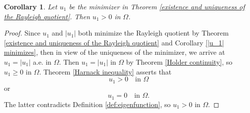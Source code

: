\documentclass[a4paper,12pt,reqno]{amsart}
\numberwithin{equation}{section}
\theoremstyle{plain}
\newtheorem{corollary}[theorem]{Corollary}
\theoremstyle{definition}
\begin{document}
\begin{corollary}\label{positivity of the first eigenfuncion}
Let $u_{1}$ be the minimizer in Theorem \ref{existence and uniqueness of the Rayleigh quotient}. Then $u_{1}>0$ in $\Omega$.
\end{corollary}
\begin{proof}
Since $u_{1}$ and $|u_{1}|$ both minimize the Rayleigh quotient by Theorem \ref{existence and uniqueness of the Rayleigh quotient} and Corollary \ref{|u_1| minimizes}, then in view of the uniqueness of the minimizer, we arrive at $u_{1}=|u_{1}|$ a.e. in $\Omega$. Then $u_{1}=|u_{1}|$  in $\Omega$ by Theorem \ref{Holder continuity}, so $u_{1}\geq 0$ in $\Omega$.  Theorem \ref{Harnack inequality} asserts that 
$$u_{1}>0 \quad \text{in } \Omega$$ 
or 
$$u_{1} = 0 \quad \text{in } \Omega.$$  
The latter  contradicts Definition \ref{def:eigenfunction}, so  $u_{1}>0$ in $\Omega$. 
\end{proof}
\end{document}
